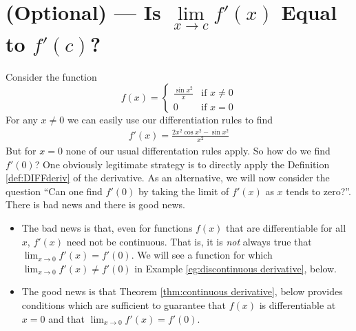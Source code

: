 \section{(Optional) --- Is $\lim\limits_{x\to c}f'(x)$ Equal to $f'(c)$?}\label{sec:cont_deriv}

Consider the function
\begin{equation*}
f(x) = \begin{cases}
            \frac{\sin x^2}{x} &\text{if $x\ne 0$} \\
             0                  &\text{if $x=0$}
        \end{cases}
\end{equation*}
For any $x\ne 0$ we can easily use our differentiation rules to find
\begin{align*}
f'(x) = \frac{2x^2\cos x^2 -\sin x^2}{x^2}
\end{align*}
But for $x=0$ none of our usual differentation rules apply. So how do we find $f'(0)$? One obviously legitimate strategy is to directly apply the 
Definition \ref{def:DIFFderiv}
of the derivative. As an alternative, we will now consider the question ``Can one find $f'(0)$ by taking the limit of $f'(x)$ as $x$ tends to zero?''.
There is bad news and there is good news.
\begin{itemize}
\item
The bad news is that,
even for functions $f(x)$ that are differentiable for all $x$, $f'(x)$ need not be continuous. That is, it is \emph{not} always true that 
$\lim_{x\rightarrow 0}f'(x) = f'(0)$. We will see a function for which 
$\lim_{x\rightarrow 0}f'(x) \ne f'(0)$ in 
Example \ref{eg:discontinuous derivative}, below.
\item
The good news is that Theorem \ref{thm:continuous derivative}, below 
provides conditions which are sufficient to guarantee that $f(x)$ is differentiable at $x=0$ and that $\lim_{x\rightarrow 0}f'(x) = f'(0)$.  
\end{itemize}



